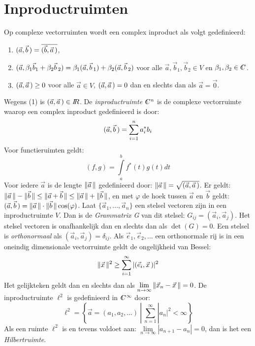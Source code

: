 \section{Inproductruimten}
Op complexe vectorruimten wordt een complex inproduct als volgt gedefinieerd:
\begin{enumerate}
\item $(\vec{a},\vec{b}\,)=\overline{(\vec{b},\vec{a}\,)}$,
\item $(\vec{a},\beta_1\vec{b}_1+\beta_2\vec{b}\,_2)=\beta_1(\vec{a},\vec{b}\,_1)+\beta_2(\vec{a},\vec{b}\,_2)$
      voor alle $\vec{a},\vec{b}_1,\vec{b}_2\in V$ en $\beta_1,\beta_2\in\CC$.
\item $(\vec{a},\vec{a}\,)\geq0$ voor alle $\vec{a}\in V$,
      $(\vec{a},\vec{a}\,)=0$ dan en slechts dan als $\vec{a}=\vec{0}$.
\end{enumerate}
Wegens (1) is $(\vec{a},\vec{a}\,)\in I\hspace{-1mm}R$. De {\it inproductruimte} $\CC^n$ is
de complexe vectorruimte waarop een complex inproduct gedefinieerd is door:
\[
(\vec{a},\vec{b}\,)=\sum_{i=1}^na_i^*b_i
\]
Voor functieruimten geldt:
\[
(f,g)=\int\limits_a^bf^*(t)g(t)dt
\]
Voor iedere $\vec{a}$ is de lengte $\|\vec{a}\,\|$ gedefinieerd door:
$\|\vec{a}\,\|=\sqrt{(\vec{a},\vec{a}\,)}$. Er geldt:
$\|\vec{a}\,\|-\|\vec{b}\,\|\leq\|\vec{a}+\vec{b}\,\|\leq\|\vec{a}\,\|+\|\vec{b}\,\|$,
en met $\varphi$ de hoek tussen $\vec{a}$ en $\vec{b}$ geldt:
$(\vec{a},\vec{b}\,)=\|\vec{a}\,\|\cdot\|\vec{b}\,\|\cos(\varphi)$.
\npar
Laat $\{\vec{a}_1,...,\vec{a}_n\}$ een stelsel vectoren zijn in een inproductruimte
$V$. Dan is de {\it Grammatrix G} van dit stelsel: $G_{ij}=(\vec{a}_i,\vec{a}_j)$.
Het stelsel vectoren is onafhankelijk dan en slechts dan als $\det(G)=0$.
\npar
Een stelsel is {\it orthonormaal} als $(\vec{a}_i,\vec{a}_j)=\delta_{ij}$.
Als $\vec{e}_1,\vec{e}_2,...$ een orthonormale rij is in een oneindig
dimensionale vectorruimte geldt de ongelijkheid van Bessel:
\[
\|\vec{x}\,\|^2\geq\sum_{i=1}^\infty|(\vec{e}_i,\vec{x}\,)|^2
\]
Het gelijkteken geldt dan en slechts dan als
$\lim\limits_{n\rightarrow\infty}\|\vec{x}_n-\vec{x}\,\|=0$.
\npar
De inproductruimte $\ell^2$ is gedefinieerd in $\CC^\infty$ door:
\[
\ell^2=\left\{\vec{a}=(a_1,a_2,...)~|~\sum_{n=1}^\infty|a_n|^2<\infty\right\}
\]
Als een ruimte $\ell^2$ is en tevens voldoet aan:
$\lim\limits_{n\rightarrow\infty}|a_{n+1}-a_n|=0$,
dan is het een {\it Hilbertruimte}.

